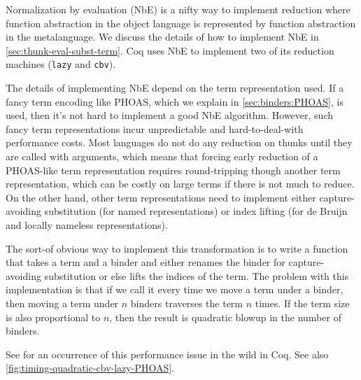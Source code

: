 Normalization by evaluation (NbE) is a nifty way to implement reduction where function abstraction in the object language is represented by function abstraction in the metalanguage.
We discuss the details of how to implement NbE in \autoref{sec:thunk-eval-subst-term}.
%
%
%
Coq uses NbE to implement two of its reduction machines (\texttt{lazy} and \texttt{cbv}).

The details of implementing NbE depend on the term representation used.
If a fancy term encoding like PHOAS, which we explain in \autoref{sec:binders:PHOAS}, is used, then it's not hard to implement a good NbE algorithm.
However, such fancy term representations incur unpredictable and hard-to-deal-with performance costs.
Most languages do not do any reduction on thunks until they are called with arguments, which means that forcing early reduction of a PHOAS-like term representation requires round-tripping though another term representation, which can be costly on large terms if there is not much to reduce.
On the other hand, other term representations need to implement either capture-avoiding substitution (for named representations) or index lifting (for de Bruijn and locally nameless representations).

The sort-of obvious way to implement this transformation is to write a function that takes a term and a binder and either renames the binder for capture-avoiding substitution or else lifts the indices of the term.
The problem with this implementation is that if we call it every time we move a term under a binder, then moving a term under $n$ binders traverses the term $n$ times.
If the term size is also proportional to $n$, then the result is quadratic blowup in the number of binders.

See  for an occurrence of this performance issue in the wild in Coq.
See also \autoref{fig:timing-quadratic-cbv-lazy-PHOAS}.


